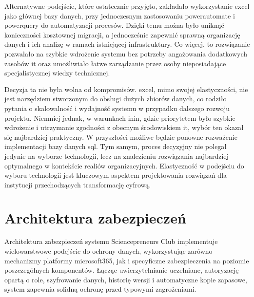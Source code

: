 Alternatywne podejście, które ostatecznie przyjęto, zakładało wykorzystanie \gls{excel} jako głównej bazy danych, przy jednoczesnym zastosowaniu \gls{powerautomate} i \gls{powerquery} do automatyzacji procesów. Dzięki temu można było uniknąć konieczności kosztownej migracji, a jednocześnie zapewnić sprawną organizację danych i ich analizę w ramach istniejącej infrastruktury. Co więcej, to rozwiązanie pozwalało na szybkie wdrożenie systemu bez potrzeby angażowania dodatkowych zasobów \gls{it} oraz umożliwiało łatwe zarządzanie przez osoby nieposiadające specjalistycznej wiedzy technicznej.

Decyzja ta nie była wolna od kompromisów. \gls{excel}, mimo swojej elastyczności, nie jest narzędziem stworzonym do obsługi dużych zbiorów danych, co rodziło pytania o skalowalność i wydajność systemu w przypadku dalszego rozwoju projektu. Niemniej jednak, w warunkach \gls{inin}, gdzie priorytetem było szybkie wdrożenie i utrzymanie zgodności z obecnym środowiskiem \gls{it}, wybór ten okazał się najbardziej praktyczny. W przyszłości możliwe będzie ponowne rozważenie implementacji bazy danych \gls{sql}.
Tym samym, proces decyzyjny nie polegał jedynie na wyborze technologii, lecz na znalezieniu rozwiązania najbardziej optymalnego w kontekście realiów organizacyjnych. Elastyczność w podejściu do wyboru technologii jest kluczowym aspektem projektowania rozwiązań dla instytucji przechodzących transformację cyfrową.

\section{Architektura zabezpieczeń}

Architektura zabezpieczeń systemu Sciencepreneurs Club implementuje wielowarstwowe podejście do ochrony danych, wykorzystując zarówno mechanizmy platformy \gls{microsoft365}, jak i specyficzne zabezpieczenia na poziomie poszczególnych komponentów. Łącząc uwierzytelnianie uczelniane, autoryzację opartą o role, szyfrowanie danych, historię wersji i automatyczne kopie zapasowe, system zapewnia solidną ochronę przed typowymi zagrożeniami.

